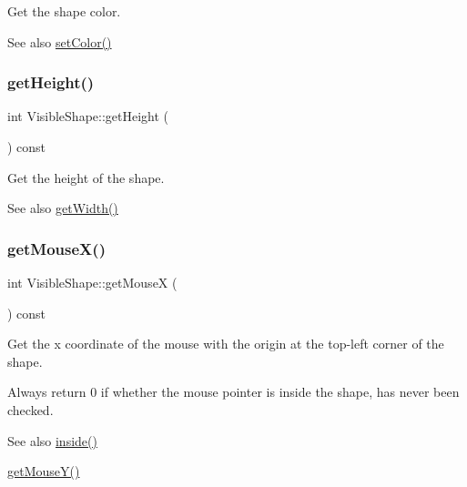 Get the shape color. 

\begin{DoxySeeAlso}{See also}
\mbox{\hyperlink{class_visible_shape_a69ae0940d090fec376bee8dc6861b8dc}{set\+Color()}} 
\end{DoxySeeAlso}
\mbox{\label{class_visible_shape_a1ce25935c729146932d649f88215ffbe}} 
\subsubsection{\texorpdfstring{get\+Height()}{getHeight()}}
{\footnotesize\ttfamily int Visible\+Shape\+::get\+Height (\begin{DoxyParamCaption}{ }\end{DoxyParamCaption}) const\hspace{0.3cm}{\ttfamily [virtual]}}



Get the height of the shape. 

\begin{DoxySeeAlso}{See also}
\mbox{\hyperlink{class_visible_shape_a667b81608efd869c907bd342397f3eb5}{get\+Width()}} 
\end{DoxySeeAlso}
\mbox{\label{class_visible_shape_a53dd71f6cee05f9707d899c4e1434070}} 
\subsubsection{\texorpdfstring{get\+Mouse\+X()}{getMouseX()}}
{\footnotesize\ttfamily int Visible\+Shape\+::get\+MouseX (\begin{DoxyParamCaption}{ }\end{DoxyParamCaption}) const\hspace{0.3cm}{\ttfamily [virtual]}}



Get the x coordinate of the mouse with the origin at the top-\/left corner of the shape. 

Always return 0 if whether the mouse pointer is inside the shape, has never been checked. \begin{DoxySeeAlso}{See also}
\mbox{\hyperlink{class_visible_shape_aab5199578030849314f0c6a339aa4281}{inside()}} 

\mbox{\hyperlink{class_visible_shape_a6b0536f0437e514ba1bda6927becb603}{get\+Mouse\+Y()}} 
\end{DoxySeeAlso}
\mbox{\label{class_visible_shape_a6b0536f0437e514ba1bda6927becb603}} 
